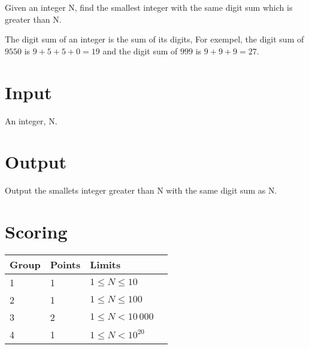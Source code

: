 
Given an integer N, find the smallest integer with the same digit sum which is greater than N.

The digit sum of an integer is the sum of its digits, For exempel, the digit sum of $9550$ is $9 + 5 + 5 + 0 = 19$ and the digit sum of $999$ is $9 + 9 + 9 = 27$.

\section*{Input}
An integer, N.

\section*{Output}
Output the smallets integer greater than N with the same digit sum as N.

\section*{Scoring}

\begin{tabular}{| l | l | l | l |}
\hline
Group & Points     & Limits \\ \hline
1     & 1          & $1 \le N \le 10$ \\ \hline	
2     & 1          & $1 \le N \le 100$ \\ \hline	
3     & 2          & $1 \le N < 10\,000$ \\ \hline	
4     & 1          & $1 \le N < 10^{20}$ \\ \hline	
\end{tabular}
